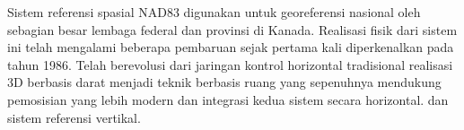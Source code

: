 Sistem referensi spasial NAD83 digunakan untuk georeferensi nasional oleh sebagian besar lembaga federal dan provinsi di Kanada. Realisasi fisik dari sistem ini telah mengalami beberapa pembaruan sejak pertama kali diperkenalkan pada tahun 1986. Telah berevolusi dari jaringan kontrol horizontal tradisional realisasi 3D berbasis darat menjadi teknik berbasis ruang yang sepenuhnya mendukung pemosisian yang lebih modern dan integrasi kedua sistem secara horizontal. dan sistem referensi vertikal. 



